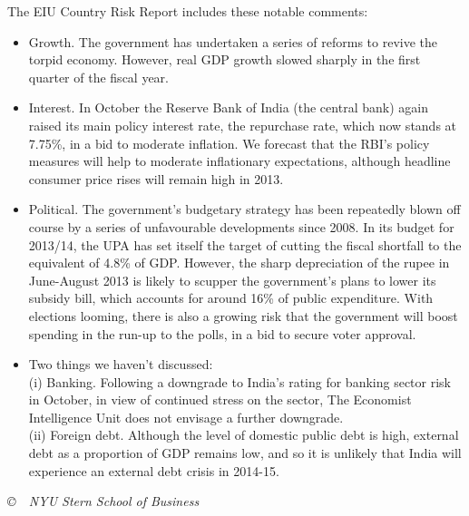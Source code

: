 \documentclass[12pt]{exam}
\begin{document}
\begin{questions}
\begin{solution}
\begin{parts}
\item The EIU Country Risk Report includes these notable comments:
\begin{itemize}
\item Growth.  The government has undertaken a series of reforms to revive the torpid economy.
However, real GDP growth slowed sharply in the first quarter of the fiscal year.

\item Interest. In October the Reserve Bank of India (the central bank) again raised its main
policy interest rate, the repurchase rate, which now stands at 7.75\%,
in a bid to moderate inflation.
We forecast that the RBI's policy measures will help to moderate inflationary
expectations, although headline consumer price rises will remain high in 2013.

\item Political. The government's budgetary strategy has been repeatedly blown
off course by a series of unfavourable developments since 2008.  In
its budget for 2013/14, the UPA has set itself the target of cutting the fiscal
shortfall to the equivalent of 4.8\% of GDP. However, the sharp depreciation of
the rupee in June-August 2013 is likely to scupper the government's plans to
lower its subsidy bill, which accounts for around 16\% of public expenditure.
With elections looming, there is also a growing risk that the government will
boost spending in the run-up to the polls, in a bid to secure voter approval.

\item Two things we haven't discussed:  \\
(i) Banking.  Following a downgrade to India's rating for banking sector risk in October, in
view of continued stress on the sector, The Economist Intelligence Unit does
not envisage a further downgrade. \\
(ii) Foreign debt.  Although the level of domestic public debt is high, external debt as a
proportion of GDP remains low, and so it is unlikely that India will experience
an external debt crisis in 2014-15.

\end{itemize}

\end{parts}
\end{solution}

\end{questions}

\vfill \centerline{\it \copyright \ \number\year \
NYU Stern School of Business}
\end{document}
